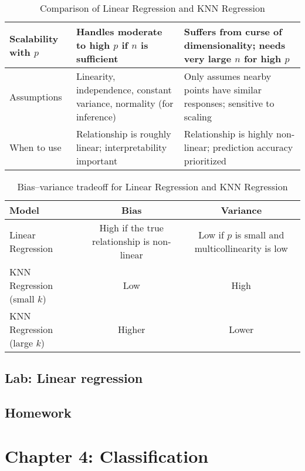 \documentclass{article}
\begin{document}
\begin{enumerate}
\begin{table}[h]
\begin{tabular}{|l|p{6cm}|p{6cm}|}
\hline
Scalability with $p$ & Handles moderate to high $p$ if $n$ is sufficient & Suffers from curse of dimensionality; needs very large $n$ for high $p$ \\
\hline
Assumptions & Linearity, independence, constant variance, normality (for inference) & Only assumes nearby points have similar responses; sensitive to scaling \\
\hline
When to use & Relationship is roughly linear; interpretability important & Relationship is highly non-linear; prediction accuracy prioritized \\
\hline
\end{tabular}
\caption{Comparison of Linear Regression and KNN Regression}
\end{table}
\begin{table}[h]
\centering
\begin{tabular}{|l|c|c|}
\hline
\textbf{Model} & \textbf{Bias} & \textbf{Variance} \\
\hline
Linear Regression & High if the true relationship is non-linear & Low if $p$ is small and multicollinearity is low \\
\hline
KNN Regression (small $k$) & Low & High \\
\hline
KNN Regression (large $k$) & Higher & Lower \\
\hline
\end{tabular}
\caption{Bias--variance tradeoff for Linear Regression and KNN Regression}
\end{table}

\end{enumerate}

\subsection*{Lab: Linear regression}

\subsection*{Homework}

\section*{Chapter 4: Classification} 
\end{document}
